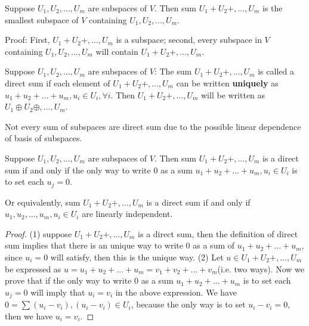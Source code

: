 \begin{refsection}
\begin{lemma}
\cite[20]{axler2015linear} Suppose $U_1,U_2,...,U_m$ are subspaces of $V$.
Then sum $U_1+U_2+,...,U_m$ is the smallest subspace of $V$ containing  $U_1,U_2,...,U_m$.
\end{lemma}
Proof: First, $U_1+U_2+,...,U_m$ is a subspace; second, every subspace in $V$ containing $U_1,U_2,...,U_m$ will contain $U_1+U_2+,...,U_m$.


\begin{definition}
\cite[21]{axler2015linear}
Suppose $U_1,U_2,...,U_m$ are subspaces of $V$:
The sum $U_1+U_2+,...,U_m$ is called a direct sum if each element of $U_1+U_2+,...,U_m$ can be written \textbf{uniquely} as $u_1+u_2+...+u_m, u_i\in U_i,\forall i$. Then $U_1+U_2+,...,U_m$ will be written as $U_1\oplus U_2\oplus,...,U_m$.
\end{definition}

\begin{remark}
Not every sum of subspaces are direct sum due to the possible linear dependence of basis of subspaces.
\end{remark}

\begin{lemma}\label{ch:linearalgebra:th:SubspaceDirectSumCriterion}
\cite[23]{axler2015linear}Suppose $U_1,U_2,...,U_m$ are subspaces of $V$.
Then sum $U_1+U_2+,...,U_m$ is a direct sum if and only if the only way to write $0$ as a sum $u_1+u_2+...+u_m, u_i\in U_i$ is to set each $u_j = 0$.

Or equivalently, sum $U_1+U_2+,...,U_m$ is a direct sum if and only if $u_1,u_2,...,u_m, u_i\in U_i$ are linearly independent.
\end{lemma}
\begin{proof}
(1) suppose $U_1+U_2+,...,U_m$ is a direct sum, then the definition of direct sum implies that there is an unique way to write 0 as a sum of $u_1+u_2+...+u_m$, since $u_i=0$ will satisfy, then this is the unique way.
(2) Let $u \in U_1+U_2+,...,U_m$ be expressed as $u=u_1+u_2+...+u_m = v_1+v_2+...+v_m$(i.e. two ways). Now we prove that if the only way to write $0$ as a sum $u_1+u_2+...+u_m$ is to set each $u_j = 0$ will imply that $u_i=v_i$ in the above expression. We have $0=\sum(u_i-v_i),(u_i-v_i)\in U_i$, because the only way is to set $u_i-v_i = 0$, then we have $u_i=v_i$.	
\end{proof}


\end{refsection}
